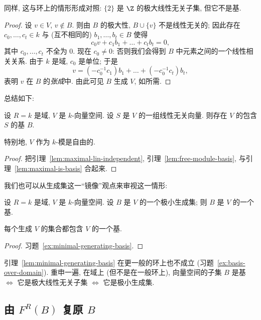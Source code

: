 同样, 这与环上的情形形成对照: $\{2\}$ 是 $\Z$ 的极大线性无关子集, 但它不是基.

\begin{proof}
设 $v\in V$, $v\notin B$. 则由 $B$ 的极大性, $B\cup\{v\}$ 不是线性无关的; 因此存在 $c_0,\dots,c_t\in k$ 与 (互不相同的) $b_1,\dots,b_t\in B$ 使得
\[
c_0 v + c_1 b_1 + \dots + c_t b_t = 0,
\]
其中 $c_0,\dots,c_t$ 不全为 $0$. 现在 $c_0\neq 0$: 否则我们会得到 $B$ 中元素之间的一个线性相关关系. 由于 $k$ 是域, $c_0$ 是单位; 于是
\[
v = (-c_0^{-1}c_1)b_1 + \dots + (-c_0^{-1}c_t)b_t,
\]
表明 $v$ 在 $B$ 的\emph{张成}中. 由此可见 $B$ 生成 $V$, 如所需.
\end{proof}

总结如下:

\begin{proposition}\label{prop:vector-space-basis}
设 $R=k$ 是域, $V$ 是 $k$-向量空间. 设 $S$ 是 $V$ 的一组线性无关向量. 则存在 $V$ 的包含 $S$ 的基 $B$.

特别地, $V$ 作为 $k$-模是自由的.
\end{proposition}

\begin{proof}
把引理~\ref{lem:maximal-lin-independent}, 引理~\ref{lem:free-module-basis}, 与引理~\ref{lem:maximal-is-basis} 合起来.
\end{proof}

我们也可以从生成集这一``镜像''观点来审视这一情形:

\begin{lemma}\label{lem:minimal-generating-basis}
设 $R=k$ 是域, $V$ 是 $k$-向量空间. 设 $B$ 是 $V$ 的一个极小生成集; 则 $B$ 是 $V$ 的一个基.

每个生成 $V$ 的集合都包含 $V$ 的一个基.
\end{lemma}

\begin{proof}
习题~\ref{ex:minimal-generating-basis}.
\end{proof}

引理~\ref{lem:minimal-generating-basis} 在更一般的环上也不成立 (习题~\ref{ex:basis-over-domain}). 重申一遍, 在域上 (但不是在一般环上), 向量空间的子集 $B$ 是基 $\Longleftrightarrow$ 它是极大线性无关子集 $\Longleftrightarrow$ 它是极小生成集.

\subsection{由 \texorpdfstring{$F^R(B)$}{FR(B)} 复原 \texorpdfstring{$B$}{B}}\label{subsec:recovering-basis}

